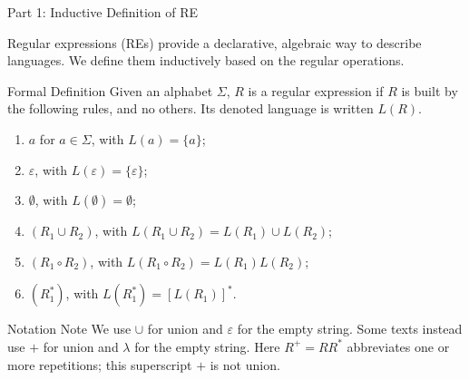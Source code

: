 \documentclass[10pt]{beamer}
\begin{document}
\begin{frame}{Part 1: Inductive Definition of RE}
  \small

  Regular expressions (REs) provide a declarative, algebraic way to describe languages. We define them inductively based on the regular operations.
  \pause

  \begin{block}{Formal Definition}
    Given an alphabet $\Sigma$, $R$ is a regular expression if $R$ is built by
    the following rules, and no others. Its denoted language is written $L(R)$.
  \begin{enumerate}\setlength\itemsep{1pt}
      \item $a$ for $a \in \Sigma$, with $L(a)=\{a\}$;
      \item $\varepsilon$, with $L(\varepsilon)=\{\varepsilon\}$;
      \item $\emptyset$, with $L(\emptyset)=\emptyset$;
      \item $(R_1 \cup R_2)$, with $L(R_1\cup R_2)=L(R_1)\cup L(R_2)$;
      \item $(R_1 \circ R_2)$, with $L(R_1\circ R_2)=L(R_1)L(R_2)$;
      \item $(R_1^*)$, with $L(R_1^*)=[L(R_1)]^*$.
    \end{enumerate}
  \end{block}
  \pause
  \begin{exampleblock}{Notation Note}
    We use $\cup$ for union and $\varepsilon$ for the empty string. Some texts instead use $+$ for union and $\lambda$ for the empty string.
    Here $R^+=RR^*$ abbreviates one or more repetitions; this superscript
    $+$ is not union.
  \end{exampleblock}
\end{frame}
\end{document}

